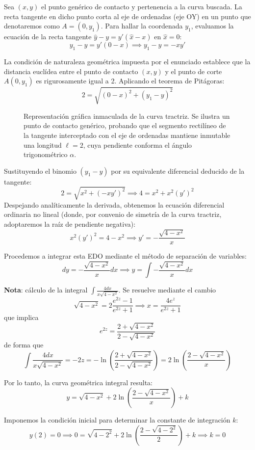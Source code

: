\begin{tcolorbox}
Sea $(x,y)$ el punto genérico de contacto y pertenencia a la curva buscada. La recta tangente en dicho punto corta al eje de ordenadas (eje OY) en un punto que denotaremos como $A = (0, y_1)$. Para hallar la coordenada $y_1$, evaluamos la ecuación de la recta tangente $\hat{y} - y = y'(\hat{x} - x)$ en $\hat{x} = 0$:
$$ y_1 - y = y'(0 - x) \implies y_1 - y = -xy' $$

La condición de naturaleza geométrica impuesta por el enunciado establece que la distancia euclídea entre el punto de contacto $(x,y)$ y el punto de corte $A(0, y_1)$ es rigurosamente igual a 2. Aplicando el teorema de Pitágoras:
$$ 2 = \sqrt{(0 - x)^2 + (y_1 - y)^2} $$

\begin{figure}[H]
    \centering
    
    \caption{Representación gráfica inmaculada de la curva tractriz. Se ilustra un punto de contacto genérico, probando que el segmento rectilíneo de la tangente interceptado con el eje de ordenadas mantiene inmutable una longitud $\ell=2$, cuya pendiente conforma el ángulo trigonométrico $\alpha$.}
\end{figure}

Sustituyendo el binomio $(y_1 - y)$ por su equivalente diferencial deducido de la tangente:
$$ 2 = \sqrt{x^2 + (-xy')^2} \implies 4 = x^2 + x^2(y')^2 $$
Despejando analíticamente la derivada, obtenemos la ecuación diferencial ordinaria no lineal (donde, por convenio de simetría de la curva tractriz, adoptaremos la raíz de pendiente negativa):
$$ x^2(y')^2 = 4 - x^2 \implies y' = -\frac{\sqrt{4 - x^2}}{x} $$

Procedemos a integrar esta EDO mediante el método de separación de variables:
$$ dy = -\frac{\sqrt{4 - x^2}}{x} dx \implies y = \int -\frac{\sqrt{4 - x^2}}{x} dx $$

\textbf{Nota}: cálculo de la integral $\int \frac{4dx}{x\sqrt{4-x^2}}$. Se resuelve mediante el cambio
$$ \sqrt{4-x^2} = 2 \frac{e^{2z}-1}{e^{2z}+1} \implies x = \frac{4e^z}{e^{2z}+1} $$
que implica
$$ e^{2z} = \frac{2+\sqrt{4-x^2}}{2-\sqrt{4-x^2}} $$
de forma que
$$ \int \frac{4dx}{x\sqrt{4-x^2}} = -2z = -\ln \left( \frac{2+\sqrt{4-x^2}}{2-\sqrt{4-x^2}} \right) = 2\ln\left( \frac{2-\sqrt{4-x^2}}{x} \right) $$

Por lo tanto, la curva geométrica integral resulta:
$$ y = \sqrt{4 - x^2} + 2\ln\left( \frac{2 - \sqrt{4 - x^2}}{x} \right) + k $$

Imponemos la condición inicial para determinar la constante de integración $k$:
$$ y(2)=0 \implies 0 = \sqrt{4 - 2^2} + 2\ln\left( \frac{2 - \sqrt{4 - 2^2}}{2} \right) + k \implies k = 0 $$


\end{tcolorbox}
